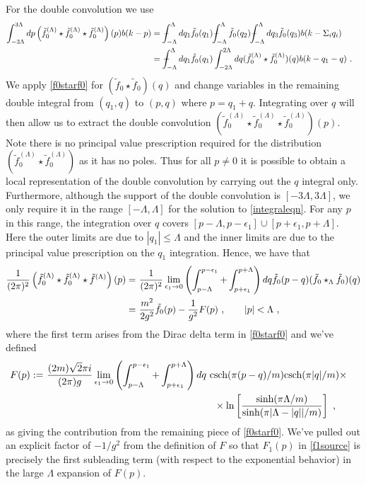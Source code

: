 \def\letter{0}\def\pr{0}\documentclass[a4paper,12pt, epsfig]{article}
\def\Xint#1{\mathchoice
   {\XXint\displaystyle\textstyle{#1}}%
   {\XXint\textstyle\scriptstyle{#1}}%
   {\XXint\scriptstyle\scriptscriptstyle{#1}}%
   {\XXint\scriptscriptstyle\scriptscriptstyle{#1}}%
   \!\int}
\def\XXint#1#2#3{{\setbox0=\hbox{$#1{#2#3}{\int}$}
     \vcenter{\hbox{$#2#3$}}\kern-.5\wd0}}
\def\dashint{\Xint-}
\renewcommand{\sinh}{\textrm{sinh}}
\newcommand{\csch}{\textrm{csch}}
\renewcommand{\(}{\begin{equation}}
\renewcommand{\)}{end{equation} \vspace{-.05in}\linebreak}
\renewcommand{\=}{\hspace{-.03in}=\hspace{-.02in}}
\renewcommand{\(}{\begin{equation}}
\renewcommand{\)}{\end{equation}}
\renewcommand{\(}{\begin{equation}}
\renewcommand{\)}{\end{equation}}
\begin{document}
For the double convolution we use
%
\begin{align}\label{f0cubedaction}
\int_{-3\Lambda}^{3\Lambda}dp \left(\tilde{f}_{0}^{(\Lambda)} \star \tilde{f}_{0}^{(\Lambda)} \star \tilde{f}_{0}^{(\Lambda)}\right)(p) b(k - p) =&~  \dashint_{-\Lambda}^{\Lambda} dq_1 \tilde{f}_0(q_1) \dashint_{-\Lambda}^{\Lambda} \tilde{f}_0(q_2) \dashint_{-\Lambda}^{\Lambda} dq_3 \tilde{f}_0(q_3) b(k- \Sigma_i q_i) \cr
=&~  \dashint_{-\Lambda}^{\Lambda} dq_1 \tilde{f}_0(q_1) \int_{-2\Lambda}^{2\Lambda} dq (\tilde{f}_{0}^{(\Lambda)} \star \tilde{f}_{0}^{(\Lambda)})(q) b(k - q_1 - q) ~.
\end{align}
%
We apply \eqref{f0starf0} for $(\tilde{f}_0 \star \tilde{f}_0)(q)$ and change variables in the remaining double integral from $(q_1,q)$ to $(p,q)$ where $p = q_1 + q$.  Integrating over $q$ will then allow us to extract the double convolution $(\tilde{f}_{0}^{(\Lambda)} \star \tilde{f}_{0}^{(\Lambda)} \star \tilde{f}_{0}^{(\Lambda)})(p)$.  Note there is no principal value prescription required for the distribution $(\tilde{f}_{0}^{(\Lambda)} \star \tilde{f}_{0}^{(\Lambda)})$ as it has no poles.  Thus for all $p \neq 0$ it is possible to obtain a local representation of the double convolution by carrying out the $q$ integral only.   Furthermore, although the support of the double convolution is $[-3\Lambda,3\Lambda]$, we only require it in the range $[-\Lambda,\Lambda]$ for the solution to \eqref{integraleqn}.  For any $p$ in this range, the integration over $q$ covers $[p-\Lambda,p-\epsilon_1] \cup [p + \epsilon_1, p + \Lambda]$.  Here the outer limits are due to $|q_1| \leq \Lambda$ and the inner limits are due to the principal value prescription on the $q_1$ integration.  Hence, we have that
%
\begin{align}\label{f0starf0starf0}
\notag
\frac{1}{(2\pi)^2} \left(\tilde{f}_{0}^{(\Lambda)} \star \tilde{f}_{0}^{(\Lambda)} \star \tilde{f}^{(\Lambda)}\right)(p) =&~ \frac{1}{(2\pi)^2} \lim_{\epsilon_1 \to 0} \left( \int_{p - \Lambda}^{p-\epsilon_1} + \int_{p+\epsilon_1}^{p+\Lambda} \right) dq \tilde{f}_0(p-q) (\tilde{f}_0 \star_{\Lambda} \tilde{f}_0)(q) \\
=&~ \frac{m^2}{2 g^2} \tilde{f}_0(p) - \frac{1}{g^2} F(p)~, \qquad |p| < \Lambda~,
\end{align}
%
where the first term arises from the Dirac delta term in \eqref{f0starf0} and we've defined
%
\begin{align}\label{Fofp}
F(p) :=&~  \frac{(2m) \sqrt{2} \pi i}{(2\pi) g} \lim_{\epsilon_1 \to 0} \left( \int_{p - \Lambda}^{p-\epsilon_1} + \int_{p+\epsilon_1}^{p+\Lambda} \right) dq ~ \csch(\pi (p-q)/m) \csch(\pi |q|/m) \times \cr
&~ \qquad \qquad \qquad \qquad \qquad \qquad \qquad \qquad \quad  \times  \ln \left[ \frac{\sinh(\pi \Lambda/m)}{\sinh(\pi |\Lambda - |q||/m)} \right] ~,
\end{align}
%
as giving the contribution from the remaining piece of \eqref{f0starf0}.  We've pulled out an explicit factor of $-1/g^2$ from the definition of $F$ so that $F_1(p)$ in \eqref{f1source} is precisely the first subleading term (with respect to the exponential behavior) in the large $\Lambda$ expansion of $F(p)$.
\end{document}
